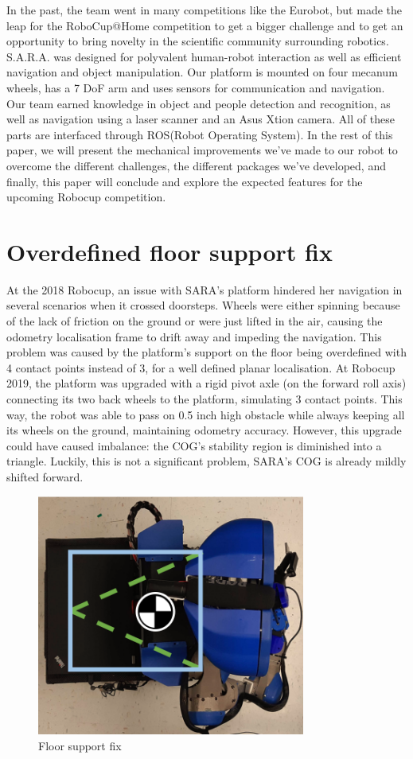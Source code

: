 \documentclass[runningheads,a4paper]{llncs}
\begin{document}
In the past, the team went in many competitions like the Eurobot, but made the leap for the RoboCup@Home competition to get a bigger challenge and to get an opportunity to bring novelty in the scientific community surrounding robotics.\\

S.A.R.A. was designed for polyvalent human-robot interaction as well as efficient navigation and object manipulation. Our platform is mounted on four mecanum wheels, has a 7 DoF arm and uses sensors for communication and navigation. Our team earned knowledge in object and people detection and recognition, as well as navigation using a laser scanner and an Asus Xtion camera. All of these parts are interfaced through ROS(Robot Operating System). In the rest of this paper, we will present the mechanical improvements we've made to our robot to overcome the different challenges, the different packages we've developed, and finally, this paper will conclude and explore the expected features for the upcoming Robocup competition.

\section{Overdefined floor support fix}
\tab At the 2018 Robocup, an issue with SARA’s platform hindered her navigation in several scenarios when it crossed doorsteps. Wheels were either spinning because of the lack of friction on the ground or were just lifted in the air, causing the odometry localisation frame to drift away and impeding the navigation. This problem was caused by the platform’s support on the floor being overdefined with 4 contact points instead of 3, for a well defined planar localisation. At Robocup 2019, the platform was upgraded with a rigid pivot axle (on the forward roll axis) connecting its two back wheels to the platform, simulating 3 contact points. This way, the robot was able to pass on 0.5 inch high obstacle while always keeping all its wheels on the ground, maintaining odometry accuracy. However, this upgrade could have caused imbalance: the COG’s stability region is diminished into a triangle. Luckily, this is not a significant problem, SARA’s COG is already mildly shifted forward. 
\begin{figure}
  \centering
  \includegraphics[width=250pt]{images/floor_support.png}
  \caption{Floor support fix}
\end{figure}
\end{document}
